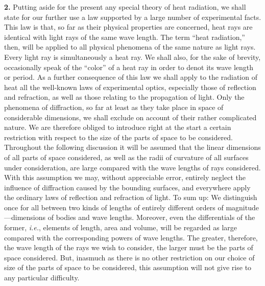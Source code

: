 \documentclass[12pt,oneside]{book}
\begin{document}
\textbf{2.} Putting aside for the present any special theory of heat radiation, we shall state for our further use a law supported by a large number of experimental facts. This law is that, so far as their physical properties are concerned, heat rays are identical with light rays of the same wave length. The term ``heat radiation,'' then, will be applied to all physical phenomena of the same nature as light rays. Every light ray is simultaneously a heat ray. We shall also, for the sake of brevity, occasionally speak of the ``color'' of a heat ray in order to denot its wave length or period. As a further consequence of this law we shall apply to the radiation of heat all the well-known laws of experimental optics, especially those of reflection and refraction, as well as those relating to the propagation of light. Only the phenomena of diffraction, so far at least as they take place in space of considerable dimensions, we shall exclude on account of their rather complicated nature. We are therefore obliged to introduce right at the start a certain restriction with respect to the size of the parts of space to be considered. Throughout the following discussion it will be assumed that the linear dimensions of all parts of space considered, as well as the radii of curvature of all surfaces under consideration, are large compared with the wave lengths of rays considered. With this assumption we may, without appreciable error, entirely neglect the influence of diffraction caused by the bounding surfaces, and everywhere apply the ordinary laws of reflection and refraction of light. To sum up: We distinguish once for all between two kinds of lengths of entirely different orders of magnitude---dimensions of bodies and wave lengths. Moreover, even the differentials of the former, \textit{i.e.}, elements of length, area and volume, will be regarded as large compared with the corresponding powers of wave lengths. The greater, therefore, the wave length of the rays we wish to consider, the larger must be the parts of space considered. But, inasmuch as there is no other restriction on our choice of size of the parts of space to be considered, this assumption will not give rise to any particular difficulty. \par
\end{document}
